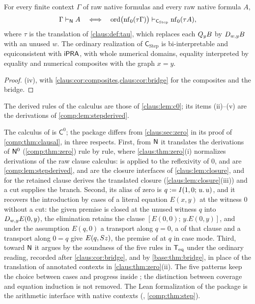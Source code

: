 \begin{theorem}
\label{comp:thm:clausal}
For every finite context $\Gamma$ of raw native formulas and every raw
native formula $A$,
\[
 \Gamma\vdash_{\mathsf{N}}A
 \quad\Longleftrightarrow\quad
 \operatorname{ord}\bigl(\operatorname{nf}_0(\tau\Gamma)\bigr)
 \vdash_{\mathsf{C}_{\mathrm{Step}}}\operatorname{nf}_0(\tau A),
\]
where $\tau$ is the translation of \cref{claus:def:tau}, which replaces each
$Q_{y}B$ by $D_{w,y}B$ with an unused $w$. The ordinary realization of
$\mathsf{C}_{\mathrm{Step}}$ is bi-interpretable and equiconsistent with
$\mathsf{iPRA}$, with whole numerical domains, equality interpreted by equality and
numerical composites with the graph $x=y$.
\end{theorem}

\begin{proof}
(iv), with \cref{claus:cor:composites,claus:cor:bridge}
for the composites and the bridge.
\end{proof}

The derived rules of the calculus are those of \cref{claus:lem:c0}; its
items (ii)--(v) are the derivations of \cref{comp:lem:stepderived}.

\begin{remark}
\label{comp:rem:clausal}
The calculus of  is $\mathsf{C}^{0}$; the package differs
from \cref{claus:sec:zero} in its proof of \cref{comp:thm:clausal}, in three
respects. First, from $\mathsf{N}$ it translates the derivations of $\mathsf{N}^{0}$
(\cref{comp:thm:zero}) rule by rule, where \cref{claus:thm:zero}(i)
normalizes derivations of the raw clause calculus:  is
 applied to the reflexivity of $0$,  and
 are \cref{comp:lem:stepderived},  and
 are the closure interfaces of \cref{claus:lem:closure}, and
for  the retained clause derives the translated closure
(\cref{claus:lem:closure}(iii)) and a cut supplies the branch. Second, its
alias of zero is $q\mathrel{:=}I(1,0;\,u.\,u)$, and it recovers the introduction
by cases of a literal equation $E(x,y)$ at the witness $0$ without a cut:
the given premise is closed at the unused witness $q$ into $D_{w,y}E(0,y)$,
the elimination retains the clause $[E(0,0);\,y.E(0,y)]$, and under the
assumption $E(q,0)$ a transport along $q=0$, a  of that clause
and a transport along $0=q$ give $E(q,S z)$, the premise of 
at $q$ in case mode. Third, toward $\mathsf{N}$ it argues by the soundness of the
five rules in $\mathsf{T}_{\mathrm{eq}}$ under the ordinary reading, recorded after
\cref{claus:cor:bridge}, and by \cref{base:thm:bridge}, in place of the
translation of annotated contexts in \cref{claus:thm:zero}(ii). The five
patterns keep the choice between cases and progress inside ;
the distinction between coverage and equation induction is not removed. The
Lean formalization of the package is the arithmetic interface with native
contexts (, \cref{comp:thm:step}).
\end{remark}

